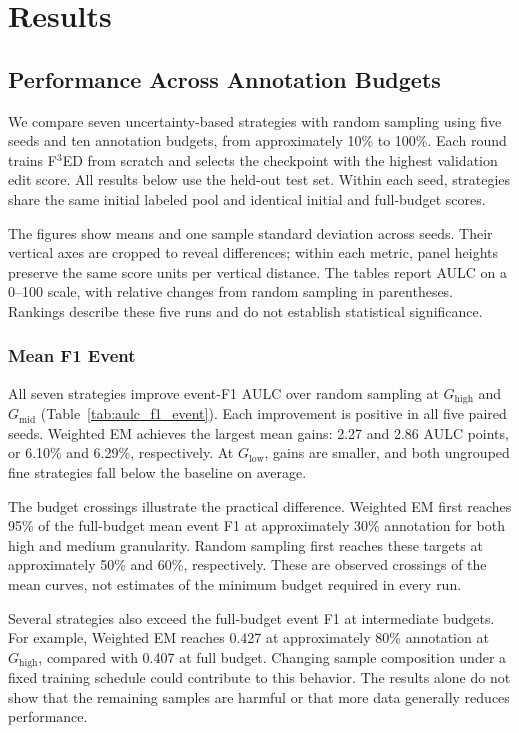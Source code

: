 \chapter{Results}
\label{chap:Results}

\section{Performance Across Annotation Budgets}
We compare seven uncertainty-based strategies with random sampling using five seeds and ten annotation budgets, from approximately 10\% to 100\%. Each round trains F$^3$ED from scratch and selects the checkpoint with the highest validation edit score. All results below use the held-out test set. Within each seed, strategies share the same initial labeled pool and identical initial and full-budget scores.

The figures show means and one sample standard deviation across seeds. Their vertical axes are cropped to reveal differences; within each metric, panel heights preserve the same score units per vertical distance. The tables report AULC on a 0--100 scale, with relative changes from random sampling in parentheses. Rankings describe these five runs and do not establish statistical significance.

\subsection{Mean F1 Event}

All seven strategies improve event-F1 AULC over random sampling at $G_{\mathrm{high}}$ and $G_{\mathrm{mid}}$ (Table~\ref{tab:aulc_f1_event}). Each improvement is positive in all five paired seeds. Weighted EM achieves the largest mean gains: 2.27 and 2.86 AULC points, or 6.10\% and 6.29\%, respectively. At $G_{\mathrm{low}}$, gains are smaller, and both ungrouped fine strategies fall below the baseline on average.

The budget crossings illustrate the practical difference. Weighted EM first reaches 95\% of the full-budget mean event F1 at approximately 30\% annotation for both high and medium granularity. Random sampling first reaches these targets at approximately 50\% and 60\%, respectively. These are observed crossings of the mean curves, not estimates of the minimum budget required in every run.

Several strategies also exceed the full-budget event F1 at intermediate budgets. For example, Weighted EM reaches 0.427 at approximately 80\% annotation at $G_{\mathrm{high}}$, compared with 0.407 at full budget. Changing sample composition under a fixed training schedule could contribute to this behavior. The results alone do not show that the remaining samples are harmful or that more data generally reduces performance.

